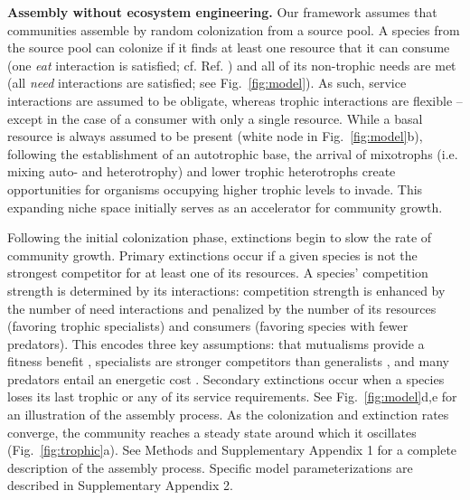 \documentclass[twocolumn,preprintnumbers,amsmath,amssymb,superscriptaddress,linenumbers]{revtex4-1}
\begin{document}
\begin{bibunit}
\vspace{0mm}
\noindent \textbf{Assembly without ecosystem engineering.}
\noindent Our framework assumes that communities assemble by random colonization from a source pool.
A species from the source pool can colonize if it finds at least one resource that it can consume (one \emph{eat} interaction is satisfied; cf. Ref. \cite{Gravel2011}) and all of its non-trophic needs are met (all \emph{need} interactions are satisfied; see Fig.\ \ref{fig:model}).
As such, service interactions are assumed to be obligate, whereas trophic interactions are flexible -- except in the case of a consumer with only a single resource.
While a basal resource is always assumed to be present (white node in Fig.\ \ref{fig:model}b), following the establishment of an autotrophic base, the arrival of mixotrophs (i.e. mixing auto- and heterotrophy) and lower trophic heterotrophs create opportunities for organisms occupying higher trophic levels to invade.
This expanding niche space initially serves as an accelerator for community growth.

Following the initial colonization phase, extinctions begin to slow the rate of community growth.
Primary extinctions occur if a given species is not the strongest competitor for at least one of its resources.
A species' competition strength is determined by its interactions: competition strength is enhanced by the number of need interactions and penalized by the number of its resources (favoring trophic specialists) and consumers (favoring species with fewer predators).
This encodes three key assumptions: that mutualisms provide a fitness benefit \cite{Bronstein1994}, specialists are stronger competitors than generalists \cite{Macarthur1964,Dykhuizen1980,Futuyma1988,Costa2015}, and many predators entail an energetic cost \cite{Brown1994}.
Secondary extinctions occur when a species loses its last trophic or any of its service requirements.
See Fig.\ \ref{fig:model}d,e for an illustration of the assembly process. 
As the colonization and extinction rates converge, the community reaches a steady state around which it oscillates (Fig.\ \ref{fig:trophic}a).
See Methods and Supplementary Appendix 1 for a complete description of the assembly process.
Specific model parameterizations are described in Supplementary Appendix 2. %



\end{bibunit}
\end{document}
